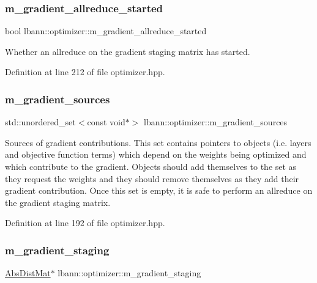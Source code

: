 \subsubsection{\texorpdfstring{m\+\_\+gradient\+\_\+allreduce\+\_\+started}{m\_gradient\_allreduce\_started}}
{\footnotesize\ttfamily bool lbann\+::optimizer\+::m\+\_\+gradient\+\_\+allreduce\+\_\+started\hspace{0.3cm}{\ttfamily [private]}}

Whether an allreduce on the gradient staging matrix has started. 

Definition at line 212 of file optimizer.\+hpp.

\mbox{\label{classlbann_1_1optimizer_aadfa322a683c2b826d0fae5f809298df}} 
\subsubsection{\texorpdfstring{m\+\_\+gradient\+\_\+sources}{m\_gradient\_sources}}
{\footnotesize\ttfamily std\+::unordered\+\_\+set$<$const void$\ast$$>$ lbann\+::optimizer\+::m\+\_\+gradient\+\_\+sources\hspace{0.3cm}{\ttfamily [private]}}

Sources of gradient contributions. This set contains pointers to objects (i.\+e. layers and objective function terms) which depend on the weights being optimized and which contribute to the gradient. Objects should add themselves to the set as they request the weights and they should remove themselves as they add their gradient contribution. Once this set is empty, it is safe to perform an allreduce on the gradient staging matrix. 

Definition at line 192 of file optimizer.\+hpp.

\mbox{\label{classlbann_1_1optimizer_a92cd058d4f9fc8162d36d52461a96df2}} 
\subsubsection{\texorpdfstring{m\+\_\+gradient\+\_\+staging}{m\_gradient\_staging}}
{\footnotesize\ttfamily \hyperlink{base_8hpp_a9a697a504ae84010e7439ffec862b470}{Abs\+Dist\+Mat}$\ast$ lbann\+::optimizer\+::m\+\_\+gradient\+\_\+staging\hspace{0.3cm}{\ttfamily [private]}}

